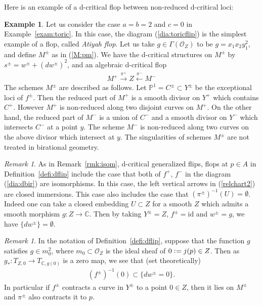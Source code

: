 \documentclass[11pt]{amsart}
\theoremstyle{plain}
\theoremstyle{definition}
\newtheorem{exam}[thm]{Example}
\theoremstyle{remark}
\newtheorem{rmk}[thm]{Remark}
\newcommand{\oO}{\mathcal{O}}
\newcommand{\id}{\textrm{id}}
\begin{document}
Here is an example of a d-critical flop
between non-reduced d-critical loci: 
\begin{exam}\label{exam:dflop:atiyah}
Let us consider the case $a=b=2$ and $c=0$ in 
Example~\ref{exam:toric}. 
In this case, the diagram (\ref{dia:toricflip}) is the simplest
example of a flop, called 
\textit{Atiyah flop}. 
Let us take $g \in \Gamma(\oO_Z)$ to be
$g=x_1 x_2 y_1^2$, 
and define $M^{\pm}$ as in (\ref{M:pm}). 
We have the d-critical structures on $M^{\pm}$
by $s^{\pm}=w^{\pm}+(dw^{\pm})^2$, and 
an algebraic d-critical flop
\begin{align*}
M^+ \stackrel{\pi^+}{\to} Z \stackrel{\pi^-}{\leftarrow} M^-
\end{align*}
The schemes $M^{\pm}$
are described as follows. 
Let $\mathbb{P}^1=C^{\pm} \subset Y^{\pm}$ be the 
exceptional loci of $f^{\pm}$. 
Then the reduced part of 
$M^+$ is a smooth divisor on $Y^+$ which contains 
$C^+$. 
However $M^+$ is non-reduced 
along two disjoint curves on $M^+$. 
On the other hand, the reduced part of 
$M^-$ is a union of 
$C^-$ and a smooth divisor on $Y^-$
which intersects $C^-$ at a point $y$. 
The scheme $M^-$ is  
non-reduced along two curves on the above divisor 
which intersect
at $y$. 
The singularities of schemes 
$M^{\pm}$ are 
not treated in birational geometry. 
\end{exam}

\begin{rmk}\label{rmk:dcrit}
As in Remark~\ref{rmk:isom}, 
d-critical generalized flips, flops at $p \in A$
in Definition~\ref{defi:dflip}
include the case that both of $f^{+}$, $f^{-}$
in the diagram (\ref{dia:dbir}) are isomorphisms. 
In this case, the left vertical 
arrows in (\ref{relchart2}) are closed immersions. 
This case also includes the case that 
$(\pi^{\pm})^{-1}(U)=\emptyset$. 
Indeed one can take a closed embedding 
$U \subset Z$ for a smooth $Z$
which admits a smooth morphism $g \colon Z \to \mathbb{C}$. 
Then by taking $Y^{\pm}=Z$, $f^{\pm}=\id$ and $w^{\pm}=g$, 
we have $\{d w^{\pm}\}=\emptyset$. 
\end{rmk}

\begin{rmk}\label{rmk:fiber}
In the notation of Definition~\ref{defi:dflip}, 
suppose that the function $g$ satisfies 
$g \in m_0^2$, where $m_0 \subset \oO_Z$ is the ideal 
sheaf 
of $0 \cneq j(p) \in Z$. 
Then as $g_{\ast} \colon T_{Z, 0} \to T_{\mathbb{C}, g(0)}$ 
is a zero map, we see that (set theoretically)
\begin{align*}
(f^{\pm})^{-1}(0) \subset \{ dw^{\pm}=0\}. 
\end{align*}
In particular if $f^{\pm}$ contracts a curve in $Y^{\pm}$ 
to a point $0 \in Z$, then it lies on $M^{\pm}$ and 
$\pi^{\pm}$ also contracts it to $p$. 
\end{rmk}
\end{document}
